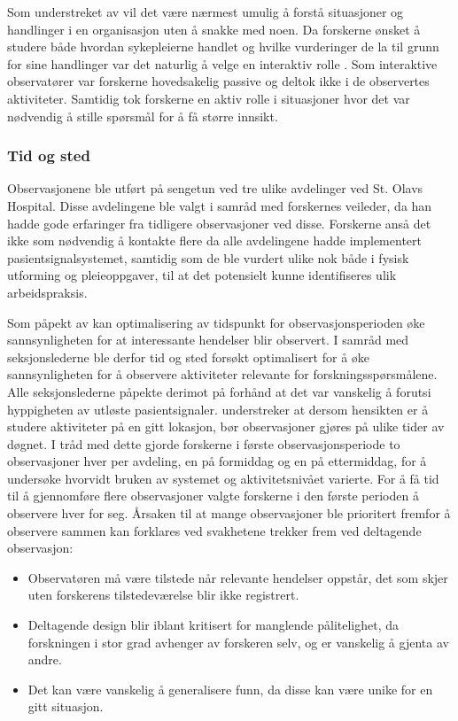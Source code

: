 \noindent
Som understreket av \citet{Myers13} vil det være nærmest umulig å forstå situasjoner og handlinger i en organisasjon uten å snakke med noen. Da forskerne ønsket å studere både hvordan sykepleierne handlet og hvilke vurderinger de la til grunn for sine handlinger var det naturlig å velge en interaktiv rolle \citep{Tjora}. Som interaktive observatører var forskerne hovedsakelig passive og deltok ikke i de observertes aktiviteter. Samtidig tok forskerne en aktiv rolle i situasjoner hvor det var nødvendig å stille spørsmål for å få større innsikt.
 
\subsubsection{Tid og sted}
Observasjonene ble utført på sengetun ved tre ulike avdelinger ved St. Olavs Hospital. Disse avdelingene ble valgt i samråd med forskernes veileder, da han hadde gode erfaringer fra tidligere observasjoner ved disse. Forskerne anså det ikke som nødvendig å kontakte flere da alle avdelingene hadde implementert pasientsignalsystemet, samtidig som de ble vurdert ulike nok både i fysisk utforming og pleieoppgaver, til at det potensielt kunne identifiseres ulik arbeidspraksis.
 
\noindent
Som påpekt av \citet{Millen00} kan optimalisering av tidspunkt for observasjonsperioden øke sannsynligheten for at interessante hendelser blir observert. I samråd med seksjonslederne ble derfor tid og sted forsøkt optimalisert for å øke sannsynligheten for å observere aktiviteter relevante for forskningsspørsmålene. Alle seksjonslederne påpekte derimot på forhånd at det var vanskelig å forutsi hyppigheten av utløste pasientsignaler. \citet{Blomberg93} understreker at dersom hensikten er å studere aktiviteter på en gitt lokasjon, bør observasjoner gjøres på ulike tider av døgnet. I tråd med dette gjorde forskerne i første observasjonsperiode to observasjoner hver per avdeling, en på formiddag og en på ettermiddag, for å undersøke hvorvidt bruken av systemet og aktivitetsnivået varierte. For å få tid til å gjennomføre flere observasjoner valgte forskerne i den første perioden å observere hver for seg. Årsaken til at mange observasjoner ble prioritert fremfor å observere sammen kan forklares ved svakhetene \citet{Oates} trekker frem ved deltagende observasjon: 

\begin{itemize}
\item Observatøren må være tilstede når relevante hendelser oppstår, det som skjer uten forskerens tilstedeværelse blir ikke registrert.
\item Deltagende design blir iblant kritisert for manglende pålitelighet, da forskningen i stor grad avhenger av forskeren selv, og er vanskelig å gjenta av andre.
\item Det kan være vanskelig å generalisere funn, da disse kan være unike for en gitt situasjon.
\end{itemize}

